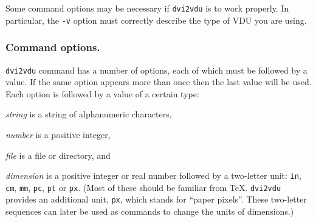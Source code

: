 Some command options may be necessary if {\tt dvi2vdu} is to work properly.
In particular, the {\tt-v} option must correctly describe the type of VDU
you are using.

\subsubsection{Command options.}

{\tt dvi2vdu} command has a number of options, each of which
must be followed by a value.
If the same option appears more than once then the last value will be used.
Each option is followed by a value of a certain type:

\begin{list}%
{}%
{\settowidth{\labelwidth}{\em string}
\settowidth{\labelsep}{aaaa}
\settowidth{\rightmargin}{aaa}
\addtolength{\labelwidth}{\labelsep}
\setlength{\leftmargin}{\labelwidth}}

\item[\em string]
 is a string of alphanumeric characters,

\item[\em number]
 is a positive integer, 

\item[\em file]
 is a file or directory, and
\item[\em dimension]
is a positive integer or real number followed by a
two-letter unit: {\tt in}, {\tt cm}, {\tt mm},  {\tt pc}, {\tt pt} or {\tt px}.
(Most of these should be familiar from \TeX.  {\tt dvi2vdu} provides an
additional unit, {\tt px}, which stands for ``paper pixels''.
These two-letter sequences can later be used as commands to
change the units of dimensions.)
\end{list}

